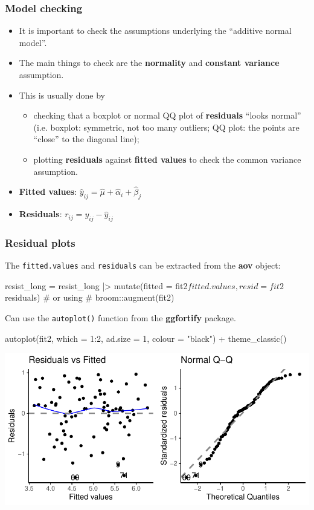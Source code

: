 \documentclass[a4paper]{article}\usepackage[]{graphicx}\usepackage[]{xcolor}
\makeatletter
\def\maxwidth{ %
  \ifdim\Gin@nat@width>\linewidth
    \linewidth
  \else
    \Gin@nat@width
  \fi
}
\makeatother
\begin{document}
\subsubsection{Model checking}
\begin{itemize}
	\item It is important to check the assumptions underlying the ``additive normal model''.
	\item The main things to check are the \textbf{normality} and \textbf{constant variance} assumption.
	\item This is usually done by
	\begin{itemize}
		\item checking that a boxplot or normal QQ plot of \textbf{residuals} ``looks normal'' (i.e. boxplot: symmetric, not too many outliers; QQ plot: the points are ``close'' to the diagonal line);
		\item plotting \textbf{residuals} against \textbf{fitted values} to check the common variance assumption.
	\end{itemize}
	\item \textbf{Fitted values}: \( \hat{y}_{ij} = \hat{\mu} + \hat{\alpha}_i + \hat{\beta}_j \)
	\item \textbf{Residuals}: \( r_{ij} = y_{ij} - \hat{y}_{ij} \) 
\end{itemize}
\subsubsection{Residual plots}

The \lstinline|fitted.values| and \lstinline|residuals| can be extracted from the \textbf{aov} object:
\begin{Schunk}
\begin{Sinput}
resist_long = resist_long |> 
  mutate(fitted = fit2$fitted.values,
         resid = fit2$residuals)
# or using 
# broom::augment(fit2)
\end{Sinput}
\end{Schunk}
Can use the \lstinline|autoplot()| function from the \textbf{ggfortify} package.
\begin{Schunk}
\begin{Sinput}
autoplot(fit2, which = 1:2, ad.size = 1, colour = "black") +
theme_classic()
\end{Sinput}


{\centering \includegraphics[width=\maxwidth]{figure/listings-unnamed-chunk-298-1} 

}

\end{Schunk}
\end{document}
